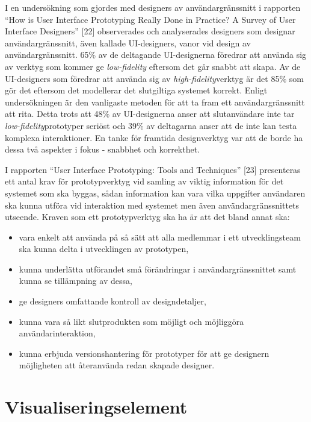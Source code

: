 \documentclass[12pt]{kththesis}
\begin{document}
I en undersökning som gjordes med designers av användargränssnitt i rapporten “How is User Interface Prototyping Really Done in Practice? A Survey of User Interface Designers” [22] observerades och analyserades designers som designar användargränssnitt, även kallade UI-designers, vanor vid design av användargränssnitt. 65\% av de deltagande UI-designerna föredrar att använda sig av verktyg som kommer ge \textit{low-fidelity} eftersom det går snabbt att skapa. Av de UI-designers som föredrar att använda sig av \textit{high-fidelity}verktyg är det 85\% som gör det eftersom det modellerar det slutgiltiga systemet korrekt. Enligt undersökningen är den vanligaste metoden för att ta fram ett användargränssnitt att rita. Detta trots att 48\% av UI-designerna anser att slutanvändare inte tar \textit{low-fidelity}prototyper seriöst och 39\% av deltagarna anser att de inte kan testa komplexa interaktioner. En tanke för framtida designverktyg var att de borde ha dessa två aspekter i fokus - snabbhet och korrekthet. 

I rapporten “User Interface Prototyping: Tools and Techniques” [23] presenteras ett antal krav för prototypverktyg vid samling av viktig information för det systemet som ska byggas, sådan information kan vara vilka uppgifter användaren ska kunna utföra vid interaktion med systemet men även användargränssnittets utseende. Kraven som ett prototypverktyg ska ha är att det bland annat ska: 

\begin{itemize}
\item vara enkelt att använda på så sätt att alla medlemmar i ett utvecklingsteam ska kunna delta i utvecklingen av prototypen,
\item  kunna underlätta utförandet små förändringar i användargränssnittet samt kunna se tillämpning av dessa, 
\item ge designers omfattande kontroll av designdetaljer,
\item kunna vara så likt slutprodukten som möjligt och möjliggöra användarinteraktion, 
\item kunna erbjuda versionshantering för prototyper för att ge designern möjligheten att återanvända redan skapade designer.

\end{itemize}

\section{Visualiseringselement} 
\end{document}
